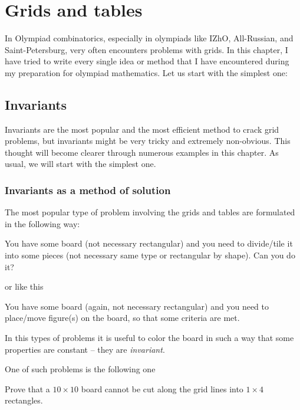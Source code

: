 \chapter{Grids and tables}

In Olympiad combinatorics, especially in olympiads like IZhO, All-Russian, and Saint-Petersburg, very often encounters problems with grids. In this chapter, I have tried to write every single idea or method that I have encountered during my preparation for olympiad mathematics. Let us start with the simplest one:

\section{Invariants}

Invariants are the most popular and the most efficient method to crack grid problems, but invariants might be very tricky and extremely non-obvious. This thought will become clearer through numerous examples in this chapter. As usual, we will start with the simplest one.

\subsection{Invariants as a method of solution}

The most popular type of problem involving the grids and tables are formulated in the following way:

\begin{fact}
    You have some board (not necessary rectangular) and you need to divide/tile it into some pieces (not necessary same type or rectangular by shape). Can you do it?
\end{fact}

or like this

\begin{fact}
    You have some board (again, not necessary rectangular) and you need to place/move figure(s) on the board, so that some criteria are met.
\end{fact}

In this types of problems it is useful to color the board in such a way that some properties are constant -- they are \textit{invariant}.

One of such problems is the following one

\begin{example}
    Prove that a $10\times 10$ board cannot be cut along the grid lines into $1\times 4$ rectangles.
\end{example}

